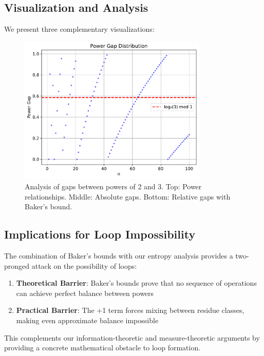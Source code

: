 \subsection{Visualization and Analysis}
We present three complementary visualizations:

\begin{figure}[h]
    \centering
    \includegraphics[width=0.8\textwidth]{figures/power_gaps.pdf}
    \caption{Analysis of gaps between powers of 2 and 3. Top: Power relationships. Middle: Absolute gaps. Bottom: Relative gaps with Baker's bound.}
    \label{fig:power_gaps}
\end{figure}

\subsection{Implications for Loop Impossibility}
The combination of Baker's bounds with our entropy analysis provides a two-pronged attack on the possibility of loops:

\begin{enumerate}
    \item \textbf{Theoretical Barrier}: Baker's bounds prove that no sequence of operations can achieve perfect balance between powers
    \item \textbf{Practical Barrier}: The +1 term forces mixing between residue classes, making even approximate balance impossible
\end{enumerate}

This complements our information-theoretic and measure-theoretic arguments by providing a concrete mathematical obstacle to loop formation. 